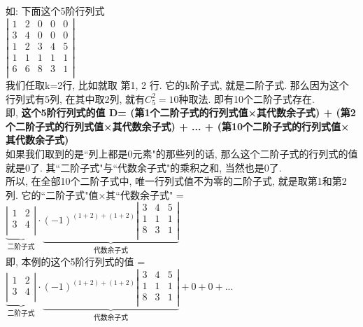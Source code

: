 \documentclass[UTF8]{ctexart}
\begin{document}
	\begin{myEnvSample}
	如: 下面这个5阶行列式 \\
	
	$
		\left| \begin{matrix}
			1&		2&		0&		0&		0\\
			\hline
			3&		4&		0&		0&		0\\
			\hline
			1&		2&		3&		4&		5\\
			1&		1&		1&		1&		1\\
			6&		6&		8&		3&		1\\
		\end{matrix} \right|
	$\\
	
	我们任取k=2行, 比如就取 第1, 2 行. 它的k阶子式, 就是二阶子式. 那么因为这个行列式有5列, 在其中取2列, 就有$C_{5}^{2}=10$种取法. 即有10个二阶子式存在. \\
	即, \textbf{这个5阶行列式的值 D=  (第1个二阶子式的行列式值×其代数余子式) + (第2个二阶子式的行列式值×其代数余子式) + ... + (第10个二阶子式的行列式值×其代数余子式)} \\
	
	如果我们取到的是``列上都是0元素"的那些列的话, 那么这个二阶子式的行列式的值就是0了. 其``二阶子式"与``代数余子式"的乘积之和, 当然也是0了. \\
	所以, 在全部10个二阶子式中,  唯一行列式值不为零的二阶子式, 就是取第1和第2列. 它的``二阶子式"值×其``代数余子式" = $
	\underset{\text{二阶子式}}{\underbrace{\left| \begin{matrix}
				1&		2\\
				3&		4\\
			\end{matrix} \right|}}\cdot \underset{\text{代数余子式}}{\underbrace{\left( -1 \right) ^{\left( 1+2 \right) +\left( 1+2 \right)}\left| \begin{matrix}
				3&		4&		5\\
				1&		1&		1\\
				8&		3&		1\\
			\end{matrix} \right|}}
	$ \\
	
	即, 本例的这个5阶行列式的值 = $
	\underset{\text{二阶子式}}{\underbrace{\left| \begin{matrix}
				1&		2\\
				3&		4\\
			\end{matrix} \right|}}\cdot \underset{\text{代数余子式}}{\underbrace{\left( -1 \right) ^{\left( 1+2 \right) +\left( 1+2 \right)}\left| \begin{matrix}
				3&		4&		5\\
				1&		1&		1\\
				8&		3&		1\\
			\end{matrix} \right|}} + 0 + 0 + ...
	$ \\
	\end{myEnvSample}	
	
\end{document}
